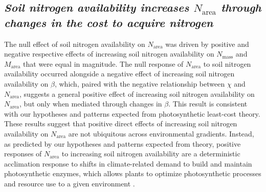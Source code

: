 \subsection{\textit{Soil nitrogen availability increases $N_\mathrm{area}$ through changes in the cost to acquire nitrogen}}
The null effect of soil nitrogen availability on $N_\mathrm{area}$ was driven by positive and negative respective effects of increasing soil nitrogen availability on $N_\mathrm{mass}$ and $M_\mathrm{area}$ that were equal in magnitude. The null response of $N_\mathrm{area}$ to soil nitrogen availability occurred alongside a negative effect of increasing soil nitrogen availability on $\beta$, which, paired with the negative relationship between $\chi$ and $N_\mathrm{area}$, suggests a general positive effect of increasing soil nitrogen availability on $N_\mathrm{area}$, but only when mediated through changes in $\beta$. This result is consistent with our hypotheses and patterns expected from photosynthetic least-cost theory. These results suggest that positive direct effects of increasing soil nitrogen availability on $N_\mathrm{area}$ are not ubiquitous across environmental gradients. Instead, as predicted by our hypotheses and patterns expected from theory, positive responses of $N_\mathrm{area}$ to increasing soil nitrogen availability are a deterministic acclimation response to shifts in climate-related demand to build and maintain photosynthetic enzymes, which allows plants to optimize photosynthetic processes and resource use to a given environment .

